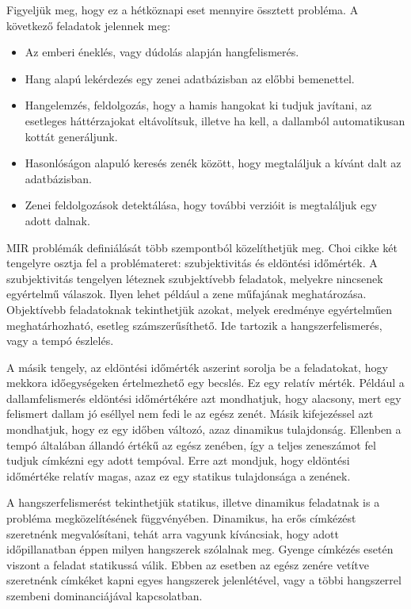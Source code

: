 Figyeljük meg, hogy ez a hétköznapi eset mennyire össztett probléma. A következő feladatok jelennek meg:
\begin{itemize}
\item Az emberi éneklés, vagy dúdolás alapján hangfelismerés.
\item Hang alapú lekérdezés egy zenei adatbázisban az előbbi bemenettel.
\item Hangelemzés, feldolgozás, hogy a hamis hangokat ki tudjuk javítani, az esetleges háttérzajokat eltávolítsuk, illetve ha kell, a dallamból automatikusan kottát generáljunk.
\item Hasonlóságon alapuló keresés zenék között, hogy megtaláljuk a kívánt dalt az adatbázisban.
\item Zenei feldolgozások detektálása, hogy további verzióit is megtaláljuk egy adott dalnak.
\end{itemize}

MIR problémák definiálását több szempontból közelíthetjük meg. Choi cikke \cite{Choi2017} két tengelyre osztja fel a problémateret: szubjektivitás és eldöntési időmérték. A szubjektivitás tengelyen léteznek szubjektívebb feladatok, melyekre nincsenek egyértelmű válaszok. Ilyen lehet például a zene műfajának meghatározása. Objektívebb feladatoknak tekinthetjük azokat, melyek eredménye egyértelműen meghatárhozható, esetleg számszerűsíthető. Ide tartozik a hangszerfelismerés, vagy a tempó észlelés. \cite{Choi2017}

A másik tengely, az eldöntési időmérték aszerint sorolja be a feladatokat, hogy mekkora időegységeken értelmezhető egy becslés. Ez egy relatív mérték. Például a dallamfelismerés eldöntési időmértékére azt mondhatjuk, hogy alacsony, mert egy felismert dallam jó eséllyel nem fedi le az egész zenét. Másik kifejezéssel azt mondhatjuk, hogy ez egy időben változó, azaz dinamikus tulajdonság. Ellenben a tempó általában állandó értékű az egész zenében, így a teljes zeneszámot fel tudjuk címkézni egy adott tempóval. Erre azt mondjuk, hogy eldöntési időmértéke relatív magas, azaz ez egy statikus tulajdonsága a zenének.\cite{Choi2017}

A hangszerfelismerést tekinthetjük statikus, illetve dinamikus feladatnak is a probléma megközelítésének függvényében. Dinamikus, ha erős címkézést szeretnénk megvalósítani, tehát arra vagyunk kíváncsiak, hogy adott időpillanatban éppen milyen hangszerek szólalnak meg. Gyenge címkézés esetén viszont a feladat statikussá válik. Ebben az esetben az egész zenére vetítve szeretnénk címkéket kapni egyes hangszerek jelenlétével, vagy a többi hangszerrel szembeni dominanciájával kapcsolatban.

